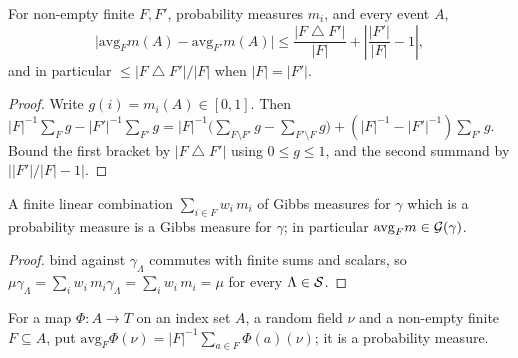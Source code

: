 \begin{lemma}
    \label{lem:sym-uniform-average-estimate}
    \leanok

    For non-empty finite $F, F'$, probability measures $m_i$, and every event $A$,
    \[
      \bigl|\mathrm{avg}_F m(A) - \mathrm{avg}_{F'} m(A)\bigr|
        \le \frac{|F \mathbin{\triangle} F'|}{|F|} + \left|\frac{|F'|}{|F|} - 1\right| ,
    \]
    and in particular $\le |F \mathbin{\triangle} F'| / |F|$ when $|F| = |F'|$.
\end{lemma}
\begin{proof}
    \leanok

    Write $g(i) = m_i(A) \in [0,1]$. Then
    $|F|^{-1}\sum_{F} g - |F'|^{-1}\sum_{F'} g
      = |F|^{-1}\bigl(\sum_{F \setminus F'} g - \sum_{F' \setminus F} g\bigr)
        + (|F|^{-1} - |F'|^{-1})\sum_{F'} g$.
    Bound the first bracket by $|F \mathbin{\triangle} F'|$ using $0 \le g \le 1$, and the second
    summand by $\bigl||F'|/|F| - 1\bigr|$.
\end{proof}

\begin{lemma}
    \label{lem:sym-convex-combination}
    \leanok

    A finite linear combination $\sum_{i \in F} w_i\, m_i$ of Gibbs measures for $\gamma$ which
    is a probability measure is a Gibbs measure for $\gamma$; in particular
    $\mathrm{avg}_F m \in \mathcal{G}(\gamma)$.
\end{lemma}
\begin{proof}
    \leanok

    $\mathrm{bind}$ against $\gamma_\Lambda$ commutes with finite sums and scalars, so
    $\mu\gamma_\Lambda = \sum_i w_i\, m_i \gamma_\Lambda = \sum_i w_i\, m_i = \mu$ for every
    $\Lambda \in \mathcal{S}$.
\end{proof}

\begin{definition}
    \label{def:sym-trans-average}
    \leanok

    For a map $\Phi : A \to T$ on an index set $A$, a random field $\nu$ and a non-empty finite
    $F \subseteq A$, put $\mathrm{avg}_F \Phi(\nu) = |F|^{-1}\sum_{a \in F} \Phi(a)(\nu)$; it is
    a probability measure.
\end{definition}

